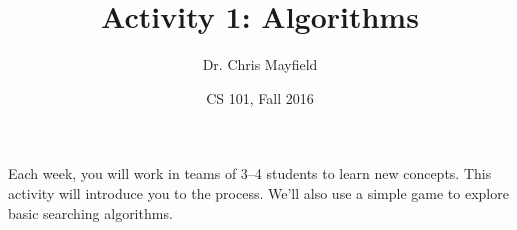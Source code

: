 \documentclass[12pt]{article}
\title{Activity 1: Algorithms}
\author{Dr. Chris Mayfield}
\date{CS 101, Fall 2016}
\begin{document}
\maketitle

Each week, you will work in teams of 3--4 students to learn new concepts.
This activity will introduce you to the process.
We'll also use a simple game to explore basic searching algorithms.



\end{document}
